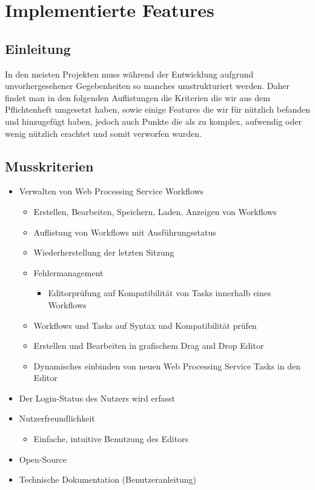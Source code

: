 \chapter{Implementierte Features}
    
    \section{Einleitung}
    In den meisten Projekten muss während der Entwicklung aufgrund unvorhergesehener Gegebenheiten so manches umstrukturiert werden.\newline
    Daher findet man in den folgenden Auflistungen die Kriterien die wir aus dem Pflichtenheft umgesetzt haben, sowie einige Features die wir für nützlich befanden und hinzugefügt haben, jedoch auch Punkte die als zu komplex, aufwendig oder wenig nützlich erachtet und somit verworfen wurden.\newline
    
    \section{Musskriterien}
    
        \begin{itemize}
			\item Verwalten von \gls{Web Processing Service} Workflows
				\begin{itemize}
					\item Erstellen, Bearbeiten, Speichern, Laden, Anzeigen von Workflows
					\item Auflistung von Workflows mit Ausführungsstatus
					\item Wiederherstellung der letzten Sitzung
					\item Fehlermanagement
					    \begin{itemize}
                        	\item Editorprüfung auf Kompatibilität von Tasks innerhalb eines Workflows
                        \end{itemize}
					\item Workflows und \Gls{Task}s auf Syntax und Kompatibilität prüfen
					\item Erstellen und Bearbeiten in grafischem \Gls{Drag and Drop} Editor
					\item Dynamisches einbinden von neuen \gls{Web Processing Service} Tasks in den Editor
				\end{itemize}
			\item Der Login-Status des Nutzers wird erfasst
			\item Nutzerfreundlichkeit
				\begin{itemize}
					\item Einfache, intuitive Benutzung des Editors
				\end{itemize}
			\item Open-Source
			\item Technische Dokumentation (Benutzeranleitung)
		\end{itemize}

